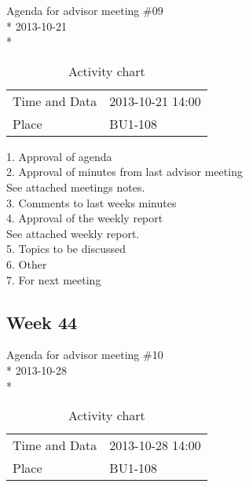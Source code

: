 \begin{center}
Agenda for advisor meeting \#09\\*
2013-10-21\\*
\end{center}

\begin{table}[H]
\begin{center}
\begin{tabular}{ l | l }
Time and Data & 2013-10-21 14:00 \\
Place & BU1-108 \\
\end{tabular}
\end{center}
\caption{Activity chart}
\label{table:activityChartAdvisorAgendaWeekN43}
\end{table}


1. Approval of agenda \\
2. Approval of minutes from last advisor meeting \\
See attached meetings notes. \\
3. Comments to last weeks minutes \\
4. Approval of the weekly report \\
See attached weekly report. \\
5. Topics to be discussed \\
6. Other \\
7. For next meeting \\

\newpage
\subsection{Week 44}

\begin{center}
Agenda for advisor meeting \#10\\*
2013-10-28\\*
\end{center}

\begin{table}[H]
\begin{center}
\begin{tabular}{ l | l }
Time and Data & 2013-10-28 14:00 \\
Place & BU1-108 \\
\end{tabular}
\end{center}
\caption{Activity chart}
\label{table:activityChartAdvisorAgendaWeek44}
\end{table}


